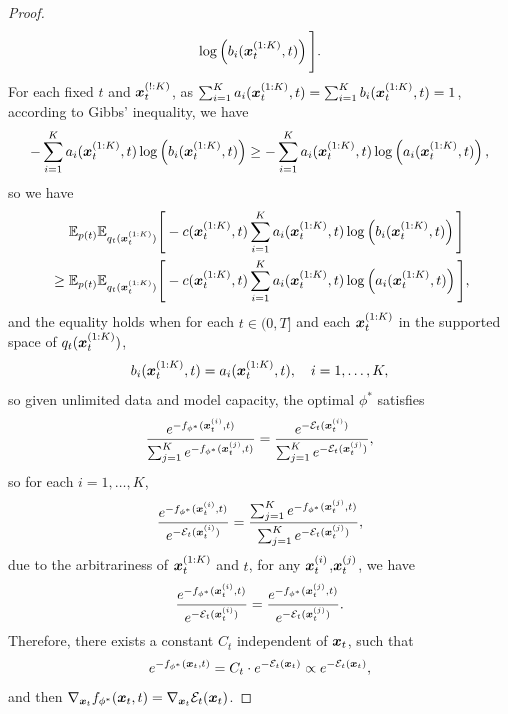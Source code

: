 \begin{proof}
\begin{equation*}
    \log \left(b_i({\bm{x}}_t^{(1:K)}, t)\right)
\Bigg].
\end{equation*}
For each fixed $t$ and ${\bm{x}}_t^{(!:K)}$, as $\sum_{i=1}^K a_i({\bm{x}}_t^{(1:K)},t) = \sum_{i=1}^K b_i({\bm{x}}_t^{(1:K)},t) = 1$, according to Gibbs' inequality, we have
\begin{equation*}
    -\sum_{i=1}^K a_i({\bm{x}}_t^{(1:K)},t) \log \left(b_i({\bm{x}}_t^{(1:K)}, t)\right)
    \geq -\sum_{i=1}^K a_i({\bm{x}}_t^{(1:K)},t) \log \left(a_i({\bm{x}}_t^{(1:K)}, t)\right),
\end{equation*}
so we have
\begin{equation*}
\begin{split}
&\phantom{{}={}}\E_{p(t)}\E_{q_t(\x_t^{(1:K)})}\Bigg[
    -c(\x_t^{(1:K)}, t) \sum_{i=1}^K
    a_i(\x_t^{(1:K)},t)
    \log \left(b_i(\x_t^{(1:K)}, t)\right)
\Bigg] \\
&\geq 
\E_{p(t)}\E_{q_t(\x_t^{(1:K)})}\Bigg[
    -c(\x_t^{(1:K)}, t) \sum_{i=1}^K
    a_i(\x_t^{(1:K)},t)
    \log \left(a_i(\x_t^{(1:K)}, t)\right)
\Bigg],
\end{split}
\end{equation*}
and the equality holds when for each $t\in(0,T]$ and each ${\bm{x}}_t^{(1:K)}$ in the supported space of $q_t({\bm{x}}_t^{(1:K)})$,
\begin{equation*}
    b_i({\bm{x}}_t^{(1:K)}, t) = a_i({\bm{x}}_t^{(1:K)}, t), \quad i=1,\dots,K,
\end{equation*}
so given unlimited data and model capacity, the optimal $\phi^*$ satisfies
\begin{equation*}
    \frac{e^{-f_{\phi^*}({\bm{x}}_t^{(i)},t)}}{\sum_{j=1}^K e^{-f_{\phi^*}({\bm{x}}_t^{(j)},t)}} = \frac{e^{-{\mathcal{E}}_t({\bm{x}}_t^{(i)})}}{\sum_{j=1}^K e^{-{\mathcal{E}}_t({\bm{x}}_t^{(j)})}},
\end{equation*}
so for each $i=1,\dots,K$,
\begin{equation*}
    \frac{e^{-f_{\phi^*}({\bm{x}}_t^{(i)},t)}}{e^{-{\mathcal{E}}_t({\bm{x}}_t^{(i)})}} = \frac{\sum_{j=1}^K e^{-f_{\phi^*}({\bm{x}}_t^{(j)},t)}}{\sum_{j=1}^K e^{-{\mathcal{E}}_t({\bm{x}}_t^{(j)})}},
\end{equation*}
due to the arbitrariness of ${\bm{x}}_t^{(1:K)}$ and $t$, for any ${\bm{x}}_t^{(i)}$,${\bm{x}}_t^{(j)}$, we have
\begin{equation*}
    \frac{e^{-f_{\phi^*}({\bm{x}}_t^{(i)},t)}}{e^{-{\mathcal{E}}_t({\bm{x}}_t^{(i)})}} = \frac{e^{-f_{\phi^*}({\bm{x}}_t^{(j)},t)}}{e^{-{\mathcal{E}}_t({\bm{x}}_t^{(j)})}}.
\end{equation*}
Therefore, there exists a constant $C_t$ independent of ${\bm{x}}_t$, such that
\begin{equation*}
    e^{-f_{\phi^*}({\bm{x}}_t,t)} = C_t \cdot e^{-{\mathcal{E}}_t({\bm{x}}_t)} \propto e^{-{\mathcal{E}}_t({\bm{x}}_t)},
\end{equation*}
and then $\nabla_{{\bm{x}}_t}f_{\phi^*}({\bm{x}}_t,t) = \nabla_{{\bm{x}}_t}{\mathcal{E}}_t({\bm{x}}_t)$.
\end{proof}














